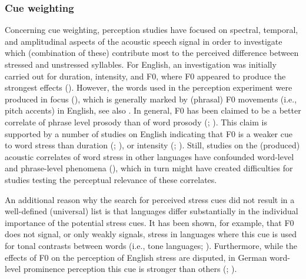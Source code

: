 \subsubsection{Cue weighting}
Concerning cue weighting, perception studies have focused on spectral, temporal, and amplitudinal aspects of the acoustic speech signal in order to investigate which (combination of these) contribute most to the perceived difference between stressed and unstressed syllables. For English, an investigation was initially carried out for duration, intensity, and F0, where F0 appeared to produce the strongest effects (\citealt{fry_experiments_1958}). However, the words used in the perception experiment were produced in focus (\citealt{fry_duration_1955}), which is generally marked by (phrasal) F0 movements (i.e., pitch accents) in English, see also \citet{beckman_articulatory_1994}. In general, F0 has been claimed to be a better correlate of phrase level prosody than of word prosody (\citealt{sluijter_spectral_1996}; \citealt{gordon_disentangling_2014}). This claim is supported by a number of studies on English indicating that F0 is a weaker cue to word stress than duration (\citealt{adams_search_1978}; \citealt{isenberg_acoustic_1978}), or intensity (\citealt{lieberman_acoustic_1959}; \citealt{beckman_stress_1986}). Still, studies on the (produced) acoustic correlates of word stress in other languages have confounded word-level and phrase-level phenomena (\citealt{roettger_methodological_2017}), which in turn might have created difficulties for studies testing the perceptual relevance of these correlates.

An additional reason why the search for perceived stress cues did not result in a well-defined (universal) list is that languages differ substantially in the individual importance of the potential stress cues. It has been shown, for example, that F0 does not signal, or only weakly signals, stress in languages where this cue is used for tonal contrasts between words (i.e., tone languages; \citealt{gordon_acoustic_2017}). Furthermore, while the effects of F0 on the perception of English stress are disputed, in German word-level prominence perception this cue is stronger than others (\citealt{kohler_perception_2008}; \citealt{niebuhr_relative_2017}).

